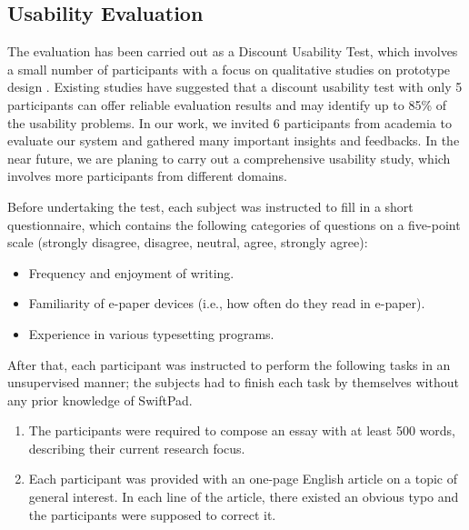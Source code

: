 \documentclass[]{sigchi}
\begin{document}
\subsection{Usability Evaluation}

The evaluation has been carried out as a Discount Usability Test, which involves a small number of participants with a focus on qualitative studies on prototype design \cite{nielsen1989usability}. Existing studies \cite{nielsen2015you}\cite{nielsen2009discount} have suggested that a discount usability test with only 5 participants can offer reliable evaluation results and may identify up to 85\% of the usability problems. In our work, we invited 6 participants from academia to evaluate our system and gathered many important insights and feedbacks.
In the near future, we are planing to carry out a comprehensive usability study, which involves more participants from different domains.

Before undertaking the test, each subject was instructed to fill in a short questionnaire, which contains the following categories of questions on a five-point scale (strongly disagree, disagree, neutral, agree, strongly agree):
\begin{itemize}
\item Frequency and enjoyment of writing.
\item Familiarity of e-paper devices (i.e., how often do they read in e-paper).
\item Experience in various typesetting programs.
\end{itemize}

After that, each participant was instructed to perform the following tasks in an unsupervised manner; the subjects had to finish each task by themselves without any prior knowledge of SwiftPad.
\begin{enumerate}
	\item The participants were required to compose an essay with at least 500 words, describing their current research focus. 
	\item Each participant was provided with an one-page English article on a topic of general interest. In each line of the article, there existed an obvious typo and the participants were supposed to correct it.
\end{enumerate}
\end{document}

